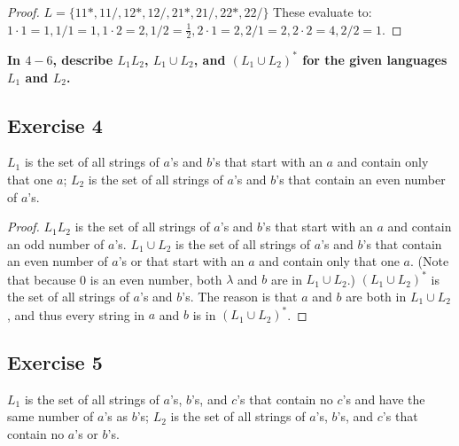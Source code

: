 \documentclass[14pt]{extarticle}
\newcommand{\cy}{\color{cyan}}
\begin{document}
\begin{proof}
    \(L = \{11*, 11/, 12*, 12/, 21*, 21/, 22*, 22/\}\) These evaluate to: \\
    \(1 \cdot 1 = 1, 1 / 1 = 1, 1 \cdot 2 = 2, 1 / 2 = \frac{1}{2}, 2 \cdot 1 = 2, 2 / 1 = 2, 2 \cdot 2 = 4, 2 / 2 = 1\).
\end{proof}

{\bf \cy In \(4-6\), describe \(L_1L_2\), \(L_1 \cup L_2\), and \((L_1 \cup L_2)^*\) for the given languages \(L_1\) and
\(L_2\).}

\subsection{Exercise 4}
\(L_1\) is the set of all strings of \(a\)’s and \(b\)’s that start with an \(a\) and contain only that one \(a\); \(L_2\)
is the set of all strings of \(a\)’s and \(b\)’s that contain an even number of \(a\)’s.

\begin{proof}
    \(L_1L_2\) is the set of all strings of \(a\)’s and \(b\)’s that start with an \(a\) and contain an odd number of \(a\)’s.
    \(L_1 \cup L_2\) is the set of all strings of \(a\)’s and \(b\)’s that contain an even number of \(a\)’s or that start
    with an \(a\) and contain only that one \(a\). (Note that because 0 is an even number, both \(\lambda\) and \(b\) are in
    \(L_1 \cup L_2\).) \((L_1 \cup L_2)^*\) is the set of all strings of \(a\)’s and \(b\)’s. The reason is that \(a\) and
    \(b\) are both in \(L_1 \cup L_2\), and thus every string in \(a\) and \(b\) is in \((L_1 \cup L_2)^*\).
\end{proof}

\subsection{Exercise 5}
\(L_1\) is the set of all strings of \(a\)’s, \(b\)’s, and \(c\)’s that contain no \(c\)’s and have the same number of
\(a\)’s as \(b\)’s; \(L_2\) is the set of all strings of \(a\)’s, \(b\)’s, and \(c\)’s that contain no \(a\)’s or
\(b\)’s.
\end{document}
